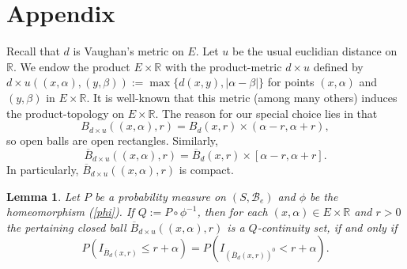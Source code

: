 \documentclass[sn-mathphys,Numbered]{sn-jnl}%
\theoremstyle{thmstyleone}%
\theoremstyle{thmstyletwo}%
\newtheorem{lemma}{Lemma}%
\theoremstyle{thmstylethree}%
\begin{document}
\section{Appendix}
Recall that $d$ is Vaughan's metric on $E$. Let $u$ be the usual euclidian distance on $\mathbb{R}$. We endow the product $E \times \mathbb{R}$ with the product-metric $d \times u$ defined
by $d \times u((x,\alpha),(y,\beta)):= \max\{d(x,y),|\alpha-\beta|\}$ for points $(x,\alpha)$ and $(y,\beta)$ in $E \times \mathbb{R}.$ It is well-known that this metric (among many others) induces the product-topology on $E \times \mathbb{R}$. The reason for our special choice lies in that
\begin{equation} \label{openballisopenrectangle}
 B_{d \times u}((x,\alpha),r)= B_d(x,r) \times (\alpha-r,\alpha+r),
\end{equation}
so open balls are open rectangles. Similarly,
\begin{equation} \label{closedballisclosedrectangle}
\overline{B}_{d \times u}((x,\alpha),r)= \overline{B}_d(x,r) \times [\alpha-r,\alpha+r].
\end{equation}
In particularly, $\overline{B}_{d \times u}((x,\alpha),r)$ is compact.\\

\begin{lemma} \label{continuityset} Let $P$ be a probability measure on $(S,\mathcal{B}_e)$ and $\phi$ be the homeomorphism (\ref{phi}). If $Q:= P \circ \phi^{-1}$, then for each $(x,\alpha) \in E \times \mathbb{R}$ and $r>0$ the pertaining closed ball
$\overline{B}_{d \times u}((x,\alpha),r)$ is a $Q$-continuity set, if and only if
$$
 P( I_{\overline{B}_d(x,r)} \le r+\alpha) = P( I_{(\overline{B}_d(x,r))^0} < r+\alpha).
$$
\end{lemma}
\end{document}
